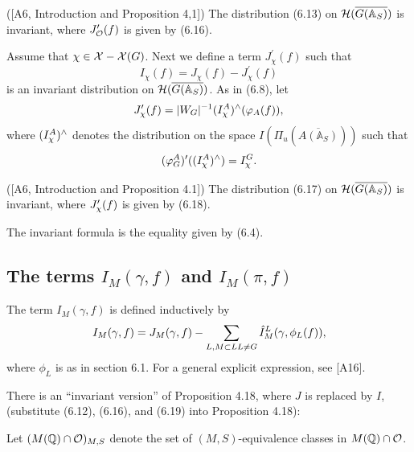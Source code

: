 \begin{proposition}
([A6, Introduction and Proposition 4,1]) The distribution
(6.13) on ${\cal{H}}(\overline{G({\mathbb{A}}_S)})$ is invariant,
where $J_{\cal{O}}^{\prime }(f)$ is given
by (6.16).
\end{proposition}

Assume that ${\chi }\in {\cal{X}}-{\cal{X}}(G)$.
Next we define a term $J_{{ \chi }}^{\prime }(f)$ such that 
\begin{equation}
I_{{\chi }}(f)=J_{{\chi }}(f)-J_{{\chi }}^{\prime }(f)
\end{equation}
is an invariant distribution on
${\cal{H}}(\overline{G({\mathbb{A}}_S)})$.
As in (6.8), let 
\begin{equation}
J_{{\chi }}^{\prime }(f)=|W_G|^{-1}(I_{{\cal \chi }}^A)^{\wedge
}(\varphi _A(f)),
\end{equation}
where $(I_{{\cal \chi }}^A)^{\wedge }$ denotes the distribution on the
space $I(\Pi _u(\overline{A({\mathbb {A}}_S)}))$ such that 
\[
(\varphi _G^A)^{\prime }((I_{{\cal \chi }}^A)^{\wedge })=I_{{\cal \chi }}^G. 
\]

\begin{proposition}
([A6, Introduction and Proposition 4.1]) The distribution (6.17)
on ${\cal{H}}(\overline{G({\mathbb{A}}_S)})$ is invariant,
where $J_{{\cal \chi }}^{\prime }(f)$ is
given by (6.18).
\end{proposition}

The invariant formula is the equality given by (6.4).

\subsection{The terms $I_M(\gamma, f)$ and $I_M(\pi,f)$}

The term $I_M(\gamma,f)$ is defined inductively by
\begin{equation}
I_M(\gamma,f)
=J_M(\gamma,f)-
\sum_{ L, M\subset L\\ L\not= G}
\hat{I}_M^L(\gamma,\phi_L(f)),
\end{equation}
where $\phi_L$ is as in section 6.1.
For a general explicit expression, see [A16].

There is an ``invariant version'' of Proposition 4.18, where $J$ is
replaced by $I$, (substitute (6.12),
(6.16), and (6.19) into Proposition 4.18):

Let $(M({\mathbb{Q}})\cap {\cal{O}})_{M,S}$ denote the set of
$(M,S)$-equivalence classes in $M({\mathbb {Q}})\cap {\cal{O}}$.

